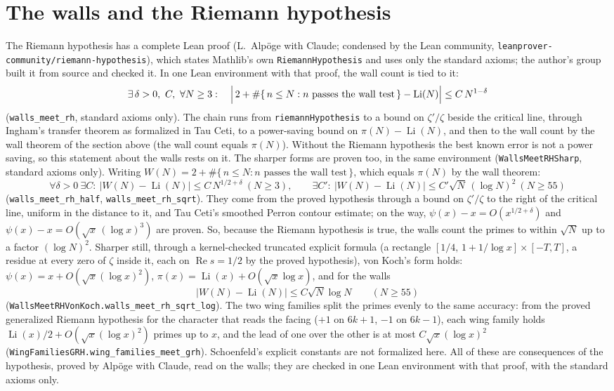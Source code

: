\documentclass[11pt]{article}
\begin{document}
\section{The walls and the Riemann hypothesis}
The Riemann hypothesis has a complete Lean proof (L.~Alp\"oge with Claude; condensed by the Lean community, \texttt{leanprover-community/riemann-hypothesis}), which states Mathlib's own \texttt{RiemannHypothesis} and uses only the standard axioms; the author's group built it from source and checked it. In one Lean environment with that proof, the wall count is tied to it:
\[ \exists\, \delta>0,\ C,\ \forall N\ge3:\quad \Bigl|\, 2 + \#\{\, n\le N : n \text{ passes the wall test} \,\} - \operatorname{Li}(N) \Bigr| \le C\, N^{1-\delta} \]
(\texttt{walls\_meet\_rh}, standard axioms only). The chain runs from \texttt{riemannHypothesis} to a bound on $\zeta'/\zeta$ beside the critical line, through Ingham's transfer theorem as formalized in Tau Ceti, to a power-saving bound on $\pi(N) - \operatorname{Li}(N)$, and then to the wall count by the wall theorem of the section above (the wall count equals $\pi(N)$). Without the Riemann hypothesis the best known error is not a power saving, so this statement about the walls rests on it. The sharper forms are proven too, in the same environment (\texttt{WallsMeetRHSharp}, standard axioms only). Writing $W(N) = 2 + \#\{\, n\le N : n \text{ passes the wall test} \,\}$, which equals $\pi(N)$ by the wall theorem:
\[ \forall \delta>0\ \exists C:\ |W(N) - \operatorname{Li}(N)| \le C\, N^{1/2+\delta}\ (N\ge3), \qquad \exists C':\ |W(N) - \operatorname{Li}(N)| \le C' \sqrt{N}\,(\log N)^2\ (N\ge55) \]
(\texttt{walls\_meet\_rh\_half}, \texttt{walls\_meet\_rh\_sqrt}). They come from the proved hypothesis through a bound on $\zeta'/\zeta$ to the right of the critical line, uniform in the distance to it, and Tau Ceti's smoothed Perron contour estimate; on the way, $\psi(x) - x = O(x^{1/2+\delta})$ and $\psi(x) - x = O(\sqrt{x}\,(\log x)^3)$ are proven. So, because the Riemann hypothesis is true, the walls count the primes to within $\sqrt{N}$ up to a factor $(\log N)^2$. Sharper still, through a kernel-checked truncated explicit formula (a rectangle $[1/4,\,1+1/\log x]\times[-T,T]$, a residue at every zero of $\zeta$ inside it, each on $\operatorname{Re} s = 1/2$ by the proved hypothesis), von Koch's form holds: $\psi(x) = x + O(\sqrt{x}(\log x)^2)$, $\pi(x) = \operatorname{Li}(x) + O(\sqrt{x}\log x)$, and for the walls
\[ |W(N) - \operatorname{Li}(N)| \le C\sqrt{N}\log N \qquad (N\ge55) \]
(\texttt{WallsMeetRHVonKoch.walls\_meet\_rh\_sqrt\_log}). The two wing families split the primes evenly to the same accuracy: from the proved generalized Riemann hypothesis for the character that reads the facing ($+1$ on $6k+1$, $-1$ on $6k-1$), each wing family holds $\operatorname{Li}(x)/2 + O(\sqrt{x}(\log x)^2)$ primes up to $x$, and the lead of one over the other is at most $C\sqrt{x}(\log x)^2$ (\texttt{WingFamiliesGRH.wing\_families\_meet\_grh}). Schoenfeld's explicit constants are not formalized here. All of these are consequences of the hypothesis, proved by Alp\"oge with Claude, read on the walls; they are checked in one Lean environment with that proof, with the standard axioms only.
\end{document}
